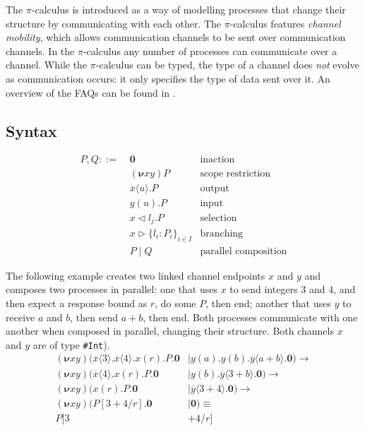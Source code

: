 \documentclass{mproj}
\newcommand{\PO}{\mathbf{0}}
\newcommand{\comp}[2]{#1 \mid #2}
\newcommand{\new}[2]{(\boldsymbol{\nu} #1 #2)}
\newcommand{\cout}[2]{\overline{#1}\langle#2\rangle.}
\newcommand{\cin}[2]{#1(#2).}
\newcommand{\select}[2]{#1\triangleleft#2.}
\newcommand{\branch}[2]{#1\triangleright#2}
\newcommand{\subst}[3]{#1[#2/#3]}
\newcommand{\picalc}{$\pi$-calculus}
\newcommand{\type}{\texttt}
\newcommand{\reduce}{\rightarrow}
\begin{document}
The \picalc{} \cite{Walker1989,Milner1989,Milner1991,Sangiorgi2001} is introduced as a way of modelling processes that change their structure by communicating with each other. The \picalc{} features \emph{channel mobility}, which allows communication channels to be sent over communication channels. In the \picalc{} any number of processes can communicate over a channel. While the \picalc{} can be typed, the type of a channel does \emph{not} evolve as communication occurs: it only specifies the type of data sent over it. An overview of the FAQs can be found in \cite{Wing2002}.

\subsection{Syntax}

\begin{align*}
P,Q ::= \; &\PO                                 & \text{inaction}             \\
           &\new{x}{y}P                         & \text{scope restriction}    \\
           &\cout{x}{u}P                        & \text{output}               \\
           &\cin{y}{u}P                         & \text{input}                \\
           &\select{x}{l_j}P                    & \text{selection}            \\
           &\branch{x}{\{l_i : P_i\}_{i \in I}} & \text{branching}            \\
           &\comp{P}{Q}                         & \text{parallel composition}
\end{align*}

The following example creates two linked channel endpoints $x$ and $y$ and composes two processes in parallel: one that uses $x$ to send integers $3$ and $4$, and then expect a response bound as $r$, do some $P$, then end; another that uses $y$ to receive $a$ and $b$, then send $a+b$, then end. Both processes communicate with one another when composed in parallel, changing their structure. Both channels $x$ and $y$ are of type \type{\#Int}).
\begin{align*}
\new{x}{y} (\comp{\cout{x}{3} \cout{x}{4} \cin{x}{r} P. \PO &}
                 {\cin{y}{a} \cin{y}{b} \cout{y}{a+b} \PO})
\reduce
\\
\new{x}{y} (\comp{\cout{x}{4} \cin{x}{r} P. \PO &}
                 {\cin{y}{b} \cout{y}{3+b} \PO})
\reduce
\\
\new{x}{y} (\comp{\cin{x}{r} P. \PO &}
                 {\cout{y}{3+4} \PO})
\reduce
\\
\new{x}{y} (\comp{\subst{P}{3+4}{r}. \PO &}
                 {\PO})
\equiv
\\
\subst{P}{3&+4}{r}
\end{align*}
\end{document}

